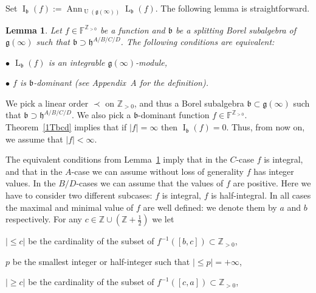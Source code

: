 \documentclass{emsprocart}
\newtheorem{lemma}[theorem]{Lemma}
\begin{document}
Set $\operatorname{I}_\mathfrak b(f):=\operatorname{Ann}_{\operatorname{U}(\mathfrak g(\infty))}\operatorname{L}_\mathfrak b(f)$. The following lemma is straightforward.
\begin{lemma}\label{L56} Let $f\in\mathbb F^{\mathbb Z_{>0}}$ be a function and $\mathfrak b$ be a splitting Borel subalgebra of $\mathfrak g(\infty)$ such that $\mathfrak b\supset\mathfrak h^{A/B/C/D}$. The following conditions are equivalent:

$\bullet$ $\operatorname{L}_{\mathfrak b}(f)$ is an integrable $\mathfrak g(\infty)$-module,

$\bullet$ $f$ is $\mathfrak b$-dominant  (see Appendix~A for the definition).\end{lemma}

We pick a linear order $\prec$ on $\mathbb Z_{>0}$, and thus a Borel subalgebra $\mathfrak b\subset\mathfrak g(\infty)$ such that $\mathfrak b\supset\mathfrak h^{A/B/C/D}$. We also pick a $\mathfrak b$-dominant function $f\in\mathbb F^{\mathbb Z_{>0}}$. Theorem~\ref{1Tbcd} implies that if $|f|=\infty$ then $\operatorname{I}_{\mathfrak b}(f)=0$. Thus, from now on, we assume that $|f|<\infty$.

The equivalent conditions from Lemma~\ref{L56} imply that in the $C$-case $f$ is integral, and that in the $A$-case we can assume without loss of generality $f$ has integer values. In the $B/D$-cases we can assume that the values of $f$ are positive. Here we have to consider two different subcases: $f$ is integral, $f$ is half-integral.
In all cases the maximal and minimal value of $f$ are well defined: we denote them by $a$ and $b$ respectively. 
For any  $c\in\mathbb Z\cup (\mathbb Z+\frac12)$ we let

$|\le c|$ be the cardinality of the subset of $f^{-1}([b, c])\subset \mathbb Z_{>0}$,

$p$ be the smallest integer or half-integer such that $|\le p|=+\infty$,

$|\ge c|$ be the cardinality of the subset of $f^{-1}([c, a])\subset \mathbb Z_{>0}$,
\end{document}
